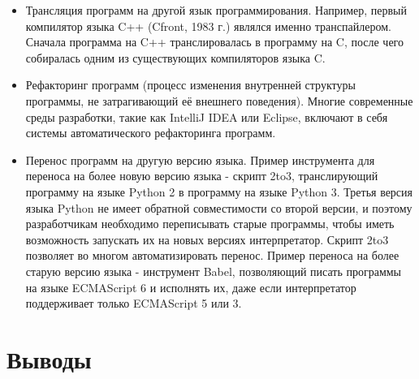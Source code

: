 \begin{itemize}
\item Трансляция программ на другой язык программирования. Например, первый компилятор языка C++ (Cfront, 1983 г.) являлся именно транспайлером. Сначала программа на C++ транслировалась в программу на C, после чего собиралась одним из существующих компиляторов языка C.
\item Рефакторинг программ (процесс изменения внутренней структуры программы, не затрагивающий её внешнего поведения). Многие современные среды разработки, такие как IntelliJ IDEA или Eclipse, включают в себя системы автоматического рефакторинга программ.
\item Перенос программ на другую версию языка. Пример инструмента для переноса на более новую версию языка - скрипт 2to3, транслирующий программу на языке Python 2 в программу на языке Python 3. Третья версия языка Python не имеет обратной совместимости со второй версии, и поэтому разработчикам необходимо переписывать старые программы, чтобы иметь возможность запускать их на новых версиях интерпретатор. Скрипт 2to3 позволяет во многом автоматизировать перенос. Пример переноса на более старую версию языка - инструмент Babel, позволяющий писать программы на языке ECMAScript 6 и исполнять их, даже если интерпретатор поддерживает только ECMAScript 5 или 3.
\end{itemize}

\section{Выводы}